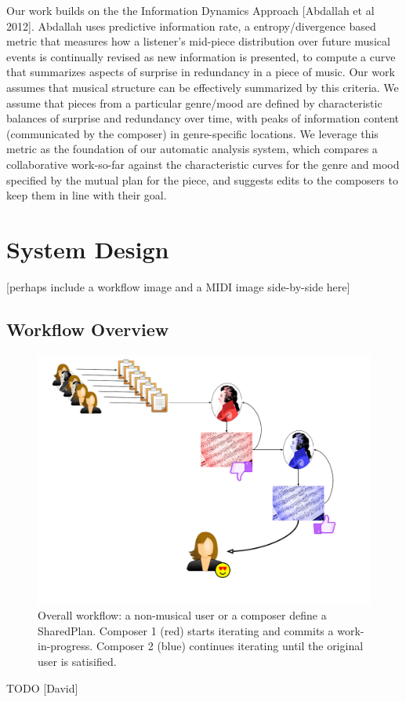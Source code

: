\documentclass[final,authoryear,11pt,times]{elsarticle}
\begin{document}
Our work builds on the the Information Dynamics Approach [Abdallah et al 2012]. Abdallah uses predictive information rate, a entropy/divergence based metric that measures how a listener's mid-piece distribution over future musical events is continually revised as new information is presented, to compute a curve that summarizes aspects of surprise in redundancy in a piece of music. Our work assumes that musical structure can be effectively summarized by this criteria. We assume that pieces from a particular genre/mood are defined by characteristic balances of surprise and redundancy over time, with peaks of information content (communicated by the composer) in genre-specific locations. We leverage this metric as the foundation of our automatic analysis system, which compares a collaborative work-so-far against the characteristic curves for the genre and mood specified by the mutual plan for the piece, and suggests edits to the composers to keep them in line with their goal.


\section{System Design}

[perhaps include a workflow image and a MIDI image side-by-side here]

\subsection{Workflow Overview}

\begin{figure}
	\centering
	\includegraphics[scale=0.4]{workflow.pdf}
	\caption{Overall workflow: a non-musical user or a composer define a SharedPlan. Composer 1 (red) starts
	iterating and commits a work-in-progress. Composer 2 (blue) continues iterating until the original user is
	satisified.}
	\label{fig:workflow}
\end{figure}
TODO [David]
\end{document}
